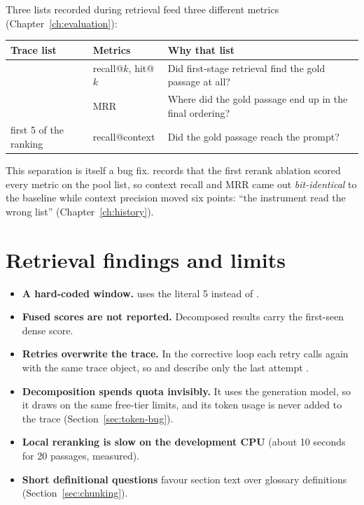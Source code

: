 Three lists recorded during retrieval feed three different metrics (Chapter~\ref{ch:evaluation}):

\begin{center}
\begin{tabularx}{\textwidth}{@{}>{\raggedright\arraybackslash}p{3.8cm}>{\raggedright\arraybackslash}p{4.0cm}L@{}}
\toprule
\textbf{Trace list} & \textbf{Metrics} & \textbf{Why that list}\\
\midrule
{} & recall@$k$, hit@$k$ & Did first-stage retrieval find the gold passage at all?\\
 & MRR & Where did the gold passage end up in the final ordering?\\
first 5 of the ranking & recall@context & Did the gold passage reach the prompt?\\
\bottomrule
\end{tabularx}
\end{center}

This separation is itself a bug fix.  records that the first rerank ablation scored every metric on the pool list, so context recall and MRR came out \emph{bit-identical} to the baseline while context precision moved six points: \enquote{the instrument read the wrong list} (Chapter~\ref{ch:history}).

\section{Retrieval findings and limits}

\begin{itemize}
  \item \textbf{A hard-coded window.}  uses the literal 5 instead of  . \tagV
  \item \textbf{Fused scores are not reported.} Decomposed results carry the first-seen dense score. \tagI
  \item \textbf{Retries overwrite the trace.} In the corrective loop each retry calls  again with the same trace object, so  and  describe only the last attempt . \tagV
  \item \textbf{Decomposition spends quota invisibly.} It uses the generation model, so it draws on the same free-tier limits, and its token usage is never added to the trace (Section~\ref{sec:token-bug}). \tagV
  \item \textbf{Local reranking is slow on the development CPU} (about 10 seconds for 20 passages, measured). \tagM
  \item \textbf{Short definitional questions} favour section text over glossary definitions (Section~\ref{sec:chunking}). \tagM
\end{itemize}

